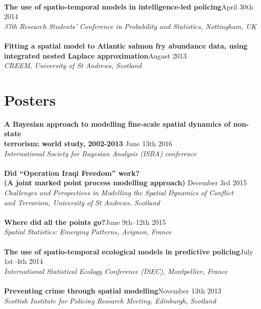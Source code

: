\documentclass[10pt,letter]{article}
\begin{document}
 \hdashrule[0.5ex]{4cm}{1pt}{1pt}\\
{\textbf{The use of spatio-temporal models in intelligence-led policing}}\hfill  April 30th 2014\\
 {\sl 37th Research Students' Conference in Probability and Statistics, Nottingham, UK}\\
 \hdashrule[0.5ex]{4cm}{1pt}{1pt}\\
{\textbf{Fitting a spatial model to Atlantic salmon fry abundance data, using\\ integrated nested Laplace approximation}}\hfill  August 2013\\
 {\sl CREEM, University of St Andrews, Scotland}\\ 
\newpage
 \vspace{-1mm}

\section*{Posters}
\vspace{1mm}

{\textbf {A Bayesian approach to modelling fine-scale spatial dynamics of non-state\\
 terrorism: world study, 2002-2013 }}\hfill June 13th 2016\\
 {\sl International Society for Bayesian Analysis (ISBA) conference}\\
 \hdashrule[0.5ex]{4cm}{1pt}{1pt}\\
 {\textbf{Did ``Operation Iraqi Freedom'' work? \\
(A joint marked point process modelling approach) }}\hfill December 3rd 2015\\
 {\sl Challenges and Perspectives in Modelling the Spatial Dynamics of Conflict\\ and Terrorism, University of St Andrews, Scotland}\\
 \hdashrule[0.5ex]{4cm}{1pt}{1pt}\\
{\textbf{Where did all the points go?}}\hfill June 9th--12th 2015\\
 {\sl Spatial Statistics: Emerging Patterns, Avignon, France}\\
\hdashrule[0.5ex]{4cm}{1pt}{1pt}\\
 {\textbf{The use of spatio-temporal ecological models in predictive policing}}\hfill July 1st--4th 2014\\
 {\sl International Statistical Ecology Conference (ISEC), Montpellier, France}\\
 \hdashrule[0.5ex]{4cm}{1pt}{1pt}\\
{\textbf{Preventing crime through spatial modelling}}\hfill November 13th 2013\\
 {\sl Scottish Institute for Policing Research Meeting, Edinburgh, Scotland}\\
\end{document}
